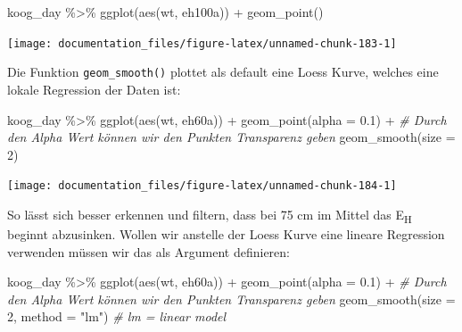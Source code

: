 \documentclass[
]{article}
\newenvironment{Shaded}{\begin{snugshade}}{\end{snugshade}}
\newcommand{\AttributeTok}[1]{\textcolor[rgb]{0.77,0.63,0.00}{#1}}
\newcommand{\CommentTok}[1]{\textcolor[rgb]{0.56,0.35,0.01}{\textit{#1}}}
\newcommand{\DecValTok}[1]{\textcolor[rgb]{0.00,0.00,0.81}{#1}}
\newcommand{\FloatTok}[1]{\textcolor[rgb]{0.00,0.00,0.81}{#1}}
\newcommand{\FunctionTok}[1]{\textcolor[rgb]{0.00,0.00,0.00}{#1}}
\newcommand{\NormalTok}[1]{#1}
\newcommand{\SpecialCharTok}[1]{\textcolor[rgb]{0.00,0.00,0.00}{#1}}
\newcommand{\StringTok}[1]{\textcolor[rgb]{0.31,0.60,0.02}{#1}}
\begin{document}
\begin{Shaded}
\begin{Highlighting}[]
\NormalTok{koog\_day  }\SpecialCharTok{\%\textgreater{}\%}
  \FunctionTok{ggplot}\NormalTok{(}\FunctionTok{aes}\NormalTok{(wt, eh100a)) }\SpecialCharTok{+}
  \FunctionTok{geom\_point}\NormalTok{()}
\end{Highlighting}
\end{Shaded}

\begin{center}\texttt{[image: documentation\_files/figure-latex/unnamed-chunk-183-1]} \end{center}

Die Funktion \texttt{geom\_smooth()} plottet als default eine Loess Kurve, welches eine lokale Regression der Daten ist:

\begin{Shaded}
\begin{Highlighting}[]
\NormalTok{koog\_day  }\SpecialCharTok{\%\textgreater{}\%}
  \FunctionTok{ggplot}\NormalTok{(}\FunctionTok{aes}\NormalTok{(wt, eh60a)) }\SpecialCharTok{+}
  \FunctionTok{geom\_point}\NormalTok{(}\AttributeTok{alpha =} \FloatTok{0.1}\NormalTok{) }\SpecialCharTok{+} \CommentTok{\# Durch den Alpha Wert können wir den Punkten Transparenz geben}
  \FunctionTok{geom\_smooth}\NormalTok{(}\AttributeTok{size =} \DecValTok{2}\NormalTok{)}
\end{Highlighting}
\end{Shaded}

\begin{center}\texttt{[image: documentation\_files/figure-latex/unnamed-chunk-184-1]} \end{center}

So lässt sich besser erkennen und filtern, dass bei 75 cm im Mittel das E\textsubscript{H} beginnt abzusinken. Wollen wir anstelle der Loess Kurve eine lineare Regression verwenden müssen wir das als Argument definieren:

\begin{Shaded}
\begin{Highlighting}[]
\NormalTok{koog\_day  }\SpecialCharTok{\%\textgreater{}\%}
  \FunctionTok{ggplot}\NormalTok{(}\FunctionTok{aes}\NormalTok{(wt, eh60a)) }\SpecialCharTok{+}
  \FunctionTok{geom\_point}\NormalTok{(}\AttributeTok{alpha =} \FloatTok{0.1}\NormalTok{) }\SpecialCharTok{+} \CommentTok{\# Durch den Alpha Wert können wir den Punkten Transparenz geben}
  \FunctionTok{geom\_smooth}\NormalTok{(}\AttributeTok{size =} \DecValTok{2}\NormalTok{, }\AttributeTok{method =} \StringTok{"lm"}\NormalTok{) }\CommentTok{\# lm = linear model}
\end{Highlighting}
\end{Shaded}
\end{document}
